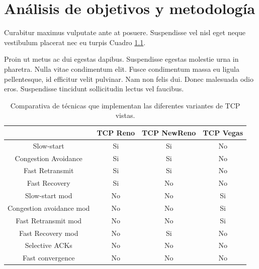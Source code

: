 \chapter{Análisis de objetivos y metodología}

Curabitur maximus vulputate ante at posuere. Suspendisse vel nisl eget neque vestibulum placerat nec eu turpis Cuadro \ref{tab:comparativa-tecnicas}.

Proin ut metus ac dui egestas dapibus. Suspendisse egestas molestie urna in pharetra. Nulla vitae condimentum elit. Fusce condimentum massa eu ligula pellentesque, id efficitur velit pulvinar. Nam non felis dui. Donec malesuada odio eros. Suspendisse tincidunt sollicitudin lectus vel faucibus.

\begin{table}[!ht]
	\begin{centering}
		\begin{tabular}{c|c|c|c}
 & TCP Reno & TCP NewReno & TCP Vegas \\ 
\hline  
Slow-start & Si & Si & No\\ 
 
Congestion Avoidance & Si & Si  & No\\ 
 
Fast Retransmit & Si & Si & No \\ 
 
Fast Recovery & Si & No & No \\ 
 
Slow-start mod & No & No & Si  \\ 
 
Congestion avoidance mod & No & No & Si \\ 
 
Fast Retransmit mod & No & No & Si\\ 
 
Fast Recovery mod & No & Si & No \\ 
 
Selective ACKs & No & No & No\\ 
 
Fast convergence & No & No & No \\ 
 
\end{tabular} 
	\caption{Comparativa de técnicas que implementan las diferentes variantes de TCP vistas.}
		\label{tab:comparativa-tecnicas}
	\end{centering}
\end{table}

